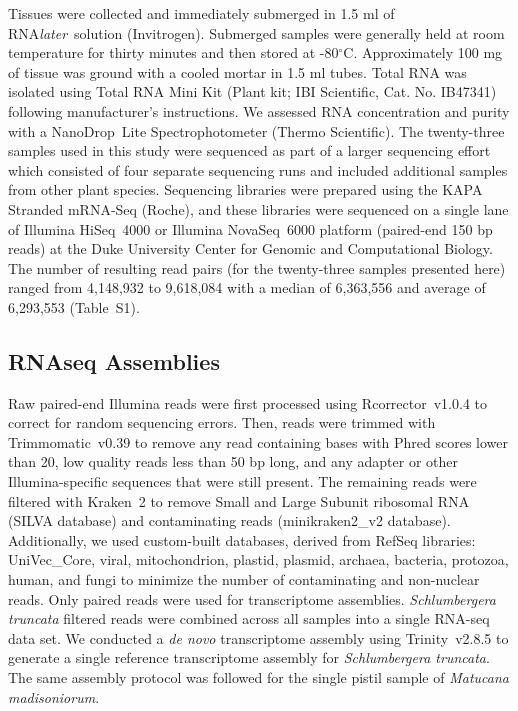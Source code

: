 \documentclass{article}
\begin{document}
Tissues were collected and immediately submerged in 1.5 ml of RNA\textit{later}\texttrademark~solution (Invitrogen).
Submerged samples were generally held at room temperature for thirty minutes and then stored at -80$^{\circ}$C.
Approximately 100 mg of tissue was ground with a cooled mortar in 1.5 ml tubes.
Total RNA was isolated using Total RNA Mini Kit (Plant kit; IBI Scientific, Cat. No. IB47341) following manufacturer's instructions.
We assessed RNA concentration and purity with a NanoDrop\texttrademark~Lite Spectrophotometer (Thermo Scientific).
The twenty-three samples used in this study were sequenced as part of a larger sequencing effort which consisted of four separate sequencing runs and included additional samples from other plant species.
Sequencing libraries were prepared using the KAPA Stranded mRNA-Seq (Roche), and these libraries were sequenced on a single lane of Illumina \mbox{HiSeq}~4000 or Illumina \mbox{NovaSeq}~6000 platform (paired-end 150 bp reads) at the Duke University Center for Genomic and Computational Biology.
The number of resulting read pairs (for the twenty-three samples presented here) ranged from 4,148,932 to 9,618,084 with a median of 6,363,556 and average of 6,293,553 (Table~S1).

\subsection*{RNAseq Assemblies}

Raw paired-end Illumina reads were first processed using \mbox{Rcorrector}~v1.0.4 \cite{song2015} to correct for random sequencing errors.
Then, reads were trimmed with \mbox{Trimmomatic}~v0.39 \cite{bolger2014} to remove any read containing bases with Phred scores lower than 20, low quality reads less than 50 bp long, and any adapter or other Illumina-specific sequences that were still present.
The remaining reads were filtered with \mbox{Kraken}~2 \cite{wood2019} to remove Small and Large Subunit ribosomal RNA (SILVA database) \cite{quast2013} and contaminating reads (minikraken2\_v2 database).
Additionally, we used custom-built databases, derived from RefSeq libraries: UniVec\_Core, viral, mitochondrion, plastid, plasmid, archaea, bacteria, protozoa, human, and fungi to minimize the number of contaminating and non-nuclear reads.
Only paired reads were used for transcriptome assemblies.
\textit{Schlumbergera truncata} filtered reads were combined across all samples into a single RNA-seq data set.
We conducted a \textit{de novo} transcriptome assembly using \mbox{Trinity}~v2.8.5 \cite{grabherr2011} to generate a single reference transcriptome assembly for \textit{Schlumbergera truncata}.
The same assembly protocol was followed for the single pistil sample of \textit{Matucana madisoniorum}.
\end{document}
